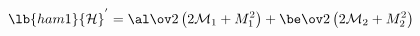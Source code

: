 \begin{equation}
\lb{ham1}
 {\cal H}^{'}={\al\ov 2} 
\left(2 {\cal M}_{1}+ M_{1}^{2}\right)
+ {\be\ov 2} 
\left(2 {\cal M}_{2}+ M_{2}^{2}\right)
\end{equation}

